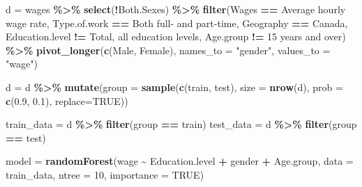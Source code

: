 \documentclass[
]{article}
\newenvironment{Shaded}{\begin{snugshade}}{\end{snugshade}}
\newcommand{\AttributeTok}[1]{\textcolor[rgb]{0.13,0.29,0.53}{#1}}
\newcommand{\ConstantTok}[1]{\textcolor[rgb]{0.56,0.35,0.01}{#1}}
\newcommand{\DecValTok}[1]{\textcolor[rgb]{0.00,0.00,0.81}{#1}}
\newcommand{\FloatTok}[1]{\textcolor[rgb]{0.00,0.00,0.81}{#1}}
\newcommand{\FunctionTok}[1]{\textcolor[rgb]{0.13,0.29,0.53}{\textbf{#1}}}
\newcommand{\NormalTok}[1]{#1}
\newcommand{\OtherTok}[1]{\textcolor[rgb]{0.56,0.35,0.01}{#1}}
\newcommand{\SpecialCharTok}[1]{\textcolor[rgb]{0.81,0.36,0.00}{\textbf{#1}}}
\newcommand{\StringTok}[1]{\textcolor[rgb]{0.31,0.60,0.02}{#1}}
\begin{document}
\begin{Shaded}
\begin{Highlighting}[]
\NormalTok{d }\OtherTok{=}\NormalTok{ wages }\SpecialCharTok{\%\textgreater{}\%}
  \FunctionTok{select}\NormalTok{(}\SpecialCharTok{!}\NormalTok{Both.Sexes) }\SpecialCharTok{\%\textgreater{}\%}
  \FunctionTok{filter}\NormalTok{(Wages }\SpecialCharTok{==} \StringTok{\textquotesingle{}Average hourly wage rate\textquotesingle{}}\NormalTok{,}
\NormalTok{         Type.of.work }\SpecialCharTok{==} \StringTok{\textquotesingle{}Both full{-} and part{-}time\textquotesingle{}}\NormalTok{,}
\NormalTok{         Geography }\SpecialCharTok{==} \StringTok{\textquotesingle{}Canada\textquotesingle{}}\NormalTok{,}
\NormalTok{         Education.level }\SpecialCharTok{!=} \StringTok{\textquotesingle{}Total, all education levels\textquotesingle{}}\NormalTok{,}
\NormalTok{         Age.group }\SpecialCharTok{!=} \StringTok{\textquotesingle{}15 years and over\textquotesingle{}}\NormalTok{) }\SpecialCharTok{\%\textgreater{}\%}
  \FunctionTok{pivot\_longer}\NormalTok{(}\FunctionTok{c}\NormalTok{(Male, Female), }
               \AttributeTok{names\_to =} \StringTok{"gender"}\NormalTok{, }
               \AttributeTok{values\_to =} \StringTok{"wage"}\NormalTok{) }

\NormalTok{d }\OtherTok{=}\NormalTok{ d }\SpecialCharTok{\%\textgreater{}\%} 
  \FunctionTok{mutate}\NormalTok{(}\AttributeTok{group =} \FunctionTok{sample}\NormalTok{(}\FunctionTok{c}\NormalTok{(}\StringTok{\textquotesingle{}train\textquotesingle{}}\NormalTok{, }\StringTok{\textquotesingle{}test\textquotesingle{}}\NormalTok{), }
                        \AttributeTok{size =} \FunctionTok{nrow}\NormalTok{(d), }
                        \AttributeTok{prob =} \FunctionTok{c}\NormalTok{(}\FloatTok{0.9}\NormalTok{, }\FloatTok{0.1}\NormalTok{), }
                        \AttributeTok{replace=}\ConstantTok{TRUE}\NormalTok{))}

\NormalTok{train\_data }\OtherTok{=}\NormalTok{ d }\SpecialCharTok{\%\textgreater{}\%} \FunctionTok{filter}\NormalTok{(group }\SpecialCharTok{==} \StringTok{\textquotesingle{}train\textquotesingle{}}\NormalTok{)}
\NormalTok{test\_data }\OtherTok{=}\NormalTok{ d }\SpecialCharTok{\%\textgreater{}\%} \FunctionTok{filter}\NormalTok{(group }\SpecialCharTok{==} \StringTok{\textquotesingle{}test\textquotesingle{}}\NormalTok{)}

\NormalTok{model }\OtherTok{=} \FunctionTok{randomForest}\NormalTok{(wage }\SpecialCharTok{\textasciitilde{}}\NormalTok{ Education.level }\SpecialCharTok{+}\NormalTok{ gender }\SpecialCharTok{+}\NormalTok{ Age.group, }
                     \AttributeTok{data =}\NormalTok{ train\_data,}
                     \AttributeTok{ntree =} \DecValTok{10}\NormalTok{,}
                     \AttributeTok{importance =} \ConstantTok{TRUE}\NormalTok{)}
\end{Highlighting}
\end{Shaded}
\end{document}
